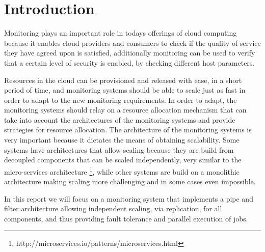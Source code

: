 \section*{Introduction}

Monitoring plays an important role in todays offerings of cloud computing because it enables cloud providers and consumers to check if the quality of service they have agreed upon is satisfied, additionally monitoring can be used to verify that a certain level of security is enabled, by checking different host parameters.

Resources in the cloud can be provisioned and released with ease, in a short period of time, and monitoring systems should be able to scale just as fast in order to adapt to the new monitoring requirements. In order to adapt, the monitoring systems should relay on a resource allocation mechanism that can take into account the architectures of the monitoring systems and provide strategies for resource allocation. The architecture of the monitoring systems is very important because it dictates the means of obtaining scalability. Some systems have architectures that allow scaling because they are build from decoupled components that can be scaled independently, very similar to the micro-services architecture \footnote{http://microservices.io/patterns/microservices.html}, while other systems are build on a monolithic architecture making scaling more challenging and in some cases even impossible.

In this report we will focus on a monitoring system that implements a pipe and filter architecture allowing independent scaling, via replication, for all components, and thus providing fault tolerance and parallel execution of jobs.
